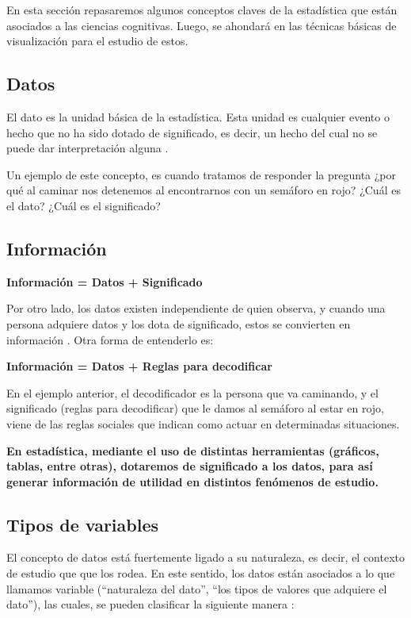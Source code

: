 \documentclass[
]{book}
\theoremstyle{definition}
\theoremstyle{definition}
\theoremstyle{definition}
\theoremstyle{definition}
\theoremstyle{remark}
\begin{document}
En esta sección repasaremos algunos conceptos claves de la estadística que están asociados a las ciencias cognitivas. Luego, se ahondará en las técnicas básicas de visualización para el estudio de estos.

\hypertarget{datos}{%
\subsection{Datos}\label{datos}}

El dato es la unidad básica de la estadística. Esta unidad es cualquier evento o hecho que no ha sido dotado de significado, es decir, un hecho del cual no se puede dar interpretación alguna \citep{brachman_knowledge_2004}.

Un ejemplo de este concepto, es cuando tratamos de responder la pregunta ¿por qué al caminar nos detenemos al encontrarnos con un semáforo en rojo? ¿Cuál es el dato? ¿Cuál es el significado?

\hypertarget{informaciuxf3n}{%
\subsection{Información}\label{informaciuxf3n}}

\textbf{Información = Datos + Significado}

Por otro lado, los datos existen independiente de quien observa, y cuando una persona adquiere datos y los dota de significado, estos se convierten en información \citep{brachman_knowledge_2004}. Otra forma de entenderlo es:

\textbf{Información = Datos + Reglas para decodificar}

En el ejemplo anterior, el decodificador es la persona que va caminando, y el significado (reglas para decodificar) que le damos al semáforo al estar en rojo, viene de las reglas sociales que indican como actuar en determinadas situaciones.

\textbf{En estadística, mediante el uso de distintas herramientas (gráficos, tablas, entre otras), dotaremos de significado a los datos, para así generar información de utilidad en distintos fenómenos de estudio.}

\hypertarget{tipos-de-variables}{%
\subsection{Tipos de variables}\label{tipos-de-variables}}

El concepto de datos está fuertemente ligado a su naturaleza, es decir, el contexto de estudio que que los rodea. En este sentido, los datos están asociados a lo que llamamos variable (``naturaleza del dato'', ``los tipos de valores que adquiere el dato''), las cuales, se pueden clasificar la siguiente manera \citep[página 7]{anderson}:
\end{document}
